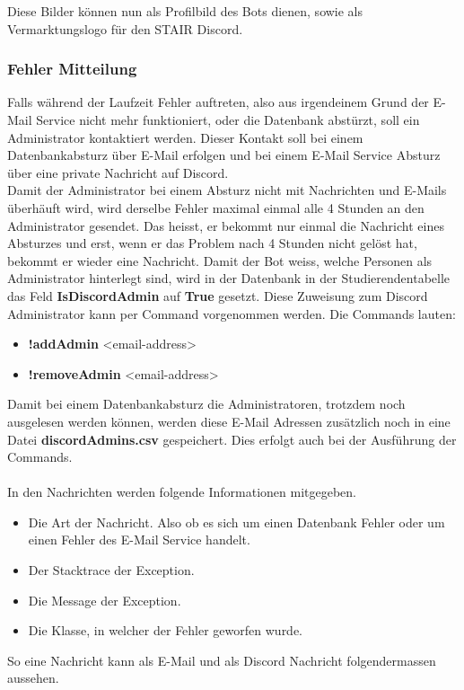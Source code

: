 \documentclass[a4paper, table]{article}
\begin{document}
Diese Bilder können nun als Profilbild des Bots dienen, sowie als Vermarktungslogo für den STAIR Discord.

\subsubsection{Fehler Mitteilung}
Falls während der Laufzeit Fehler auftreten, also aus irgendeinem Grund der E-Mail Service nicht mehr funktioniert, oder die Datenbank abstürzt, soll ein Administrator kontaktiert werden. 
Dieser Kontakt soll bei einem Datenbankabsturz über E-Mail erfolgen und bei einem E-Mail Service Absturz über eine private Nachricht auf Discord.\\
Damit der Administrator bei einem Absturz nicht mit Nachrichten und E-Mails überhäuft wird, wird derselbe Fehler maximal einmal alle 4 Stunden an den Administrator gesendet. 
Das heisst, er bekommt nur einmal die Nachricht eines Absturzes und erst, wenn er das Problem nach 4 Stunden nicht gelöst hat, bekommt er wieder eine Nachricht.
\newpage
Damit der Bot weiss, welche Personen als Administrator hinterlegt sind, wird in der Datenbank in der Studierendentabelle das Feld \textbf{IsDiscordAdmin} auf \textbf{True} gesetzt. 
Diese Zuweisung zum Discord Administrator kann per Command vorgenommen werden. 
Die Commands lauten:
\begin{itemize}
    \item \textbf{!addAdmin} <email-address>
    \item \textbf{!removeAdmin} <email-address>
\end{itemize}
Damit bei einem Datenbankabsturz die Administratoren, trotzdem noch ausgelesen werden können, werden diese E-Mail Adressen zusätzlich noch in eine Datei \textbf{discordAdmins.csv} gespeichert. 
Dies erfolgt auch bei der Ausführung der Commands.\\\\
In den Nachrichten werden folgende Informationen mitgegeben.
\begin{itemize}
    \item Die Art der Nachricht. Also ob es sich um einen Datenbank Fehler oder um einen Fehler des E-Mail Service handelt.
    \item Der Stacktrace der Exception.
    \item Die Message der Exception.
    \item Die Klasse, in welcher der Fehler geworfen wurde.
\end{itemize}
So eine Nachricht kann als E-Mail und als Discord Nachricht folgendermassen aussehen.
\end{document}
